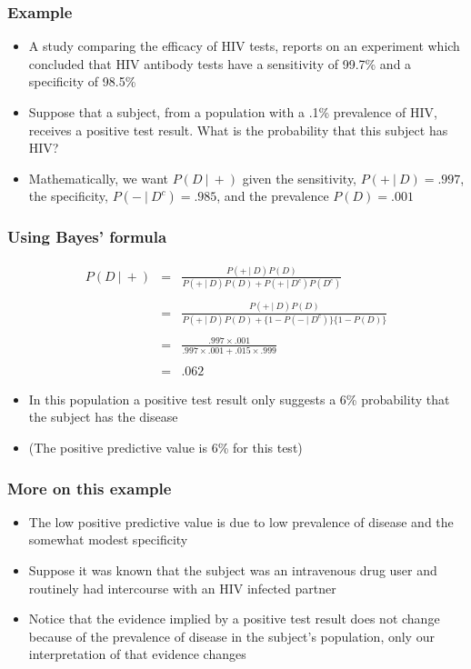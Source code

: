 \documentclass[aspectratio=169]{beamer}
\begin{document}
\begin{frame}\frametitle{Example} 
\begin{itemize}
\item A study comparing the efficacy of HIV tests, reports on an
  experiment which concluded that HIV antibody tests have a
  sensitivity of 99.7\% and a specificity of 98.5\%
\item Suppose that a subject, from a population with a .1\% prevalence
  of HIV, receives a positive test result. What is the probability
  that this subject has HIV?
\item Mathematically, we want $P(D ~|~ +)$ given the sensitivity, $P(+
  ~|~ D) = .997$, the specificity, $P(- ~|~ D^c) =.985$, and the
  prevalence $P(D) = .001$
\end{itemize}
\end{frame}

\begin{frame}\frametitle{Using Bayes' formula}
\begin{eqnarray*}
  P(D ~|~ +) & = &\frac{P(+~|~D)P(D)}{P(+~|~D)P(D) + P(+~|~D^c)P(D^c)}\\ \\
 & = & \frac{P(+~|~D)P(D)}{P(+~|~D)P(D) + \{1-P(-~|~D^c)\}\{1 - P(D)\}} \\ \\
 & = & \frac{.997\times .001}{.997 \times .001 + .015 \times .999}\\ \\
 & = & .062
\end{eqnarray*}
\begin{itemize}
\item In this population a positive test result only suggests a 6\% probability that
 the subject has the disease 
\item (The positive predictive value is 6\% for this test)
\end{itemize}
\end{frame}

\begin{frame}\frametitle{More on this example}
\begin{itemize}
\item The low positive predictive value is due to low prevalence of disease and the
somewhat modest specificity
\item Suppose it was known that the subject was an intravenous drug
  user and routinely had intercourse with an HIV infected partner
\item Notice that the evidence implied by a positive test result does not change 
  because of the prevalence of disease in the subject's population, only our
  interpretation of that evidence changes
\end{itemize}
\end{frame}
\end{document}
